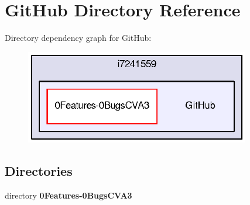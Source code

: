 \section{Git\-Hub Directory Reference}
\label{dir_8475a8686ee06e1111e8526e55a23997}
Directory dependency graph for Git\-Hub\-:
\nopagebreak
\begin{figure}[H]
\begin{center}
\leavevmode
\includegraphics[width=278pt]{dir_8475a8686ee06e1111e8526e55a23997_dep}
\end{center}
\end{figure}
\subsection*{Directories}
\begin{DoxyCompactItemize}
\item 
directory {\bf 0\-Features-\/0\-Bugs\-C\-V\-A3}
\end{DoxyCompactItemize}
